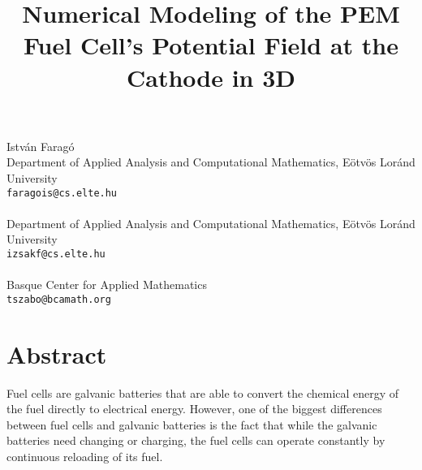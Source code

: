 \title{Numerical Modeling of the PEM Fuel Cell's Potential Field at the Cathode in 3D}
 \author{} \institute{}
\maketitle
\begin{center}
{\large Istv\'an Farag\'o}\\
Department of Applied Analysis and Computational Mathematics, E\"otv\"os Lor\'and University\\
{\tt faragois@cs.elte.hu}
\\ \vspace{4mm}{\large Ferenc Izs\'ak}\\
Department of Applied Analysis and Computational Mathematics, E\"otv\"os Lor\'and University\\
{\tt izsakf@cs.elte.hu}
\\ \vspace{4mm}{\large Tam\'as Szab\'o}\\
Basque Center for Applied Mathematics\\
{\tt tszabo@bcamath.org}

\end{center}

\section*{Abstract}

\newcommand{\nnu}{\textrm{\boldmath$\nu$}}
\newcommand{\ii}{\mathbf{i}}
\newcommand{\II}{\mathbf{I}}

Fuel cells are galvanic batteries that are able to convert the chemical energy of the fuel directly to electrical energy. However, one of the biggest differences between fuel cells and galvanic batteries is the fact that while the galvanic batteries need changing or charging, the fuel cells can operate constantly by continuous reloading of its fuel. 

